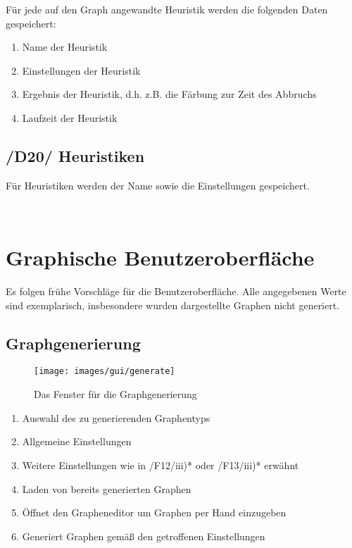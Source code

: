 \documentclass{article}
\begin{document}
	Für jede auf den Graph angewandte Heuristik werden die folgenden Daten gespeichert:
	\begin{enumerate}[--]
		\item{Name der Heuristik}
		\item{Einstellungen der Heuristik}
		\item{Ergebnis der Heuristik, d.h. z.B. die Färbung zur Zeit des Abbruchs}
		\item{Laufzeit der Heuristik}
	\end{enumerate}
	
	\subsection*{/D20/ Heuristiken} \label{d20} 
	Für Heuristiken werden der Name sowie die Einstellungen gespeichert.
	
	~\newpage
	\section{Graphische Benutzeroberfläche}
	Es folgen frühe Vorschläge für die Benutzeroberfläche. Alle angegebenen Werte sind exemplarisch, insbesondere wurden dargestellte Graphen nicht generiert.
	
	
	
	\subsection{Graphgenerierung}
	\begin{figure}[!h]
		\centering
		\texttt{[image: images/gui/generate]}
		\caption{Das Fenster für die Graphgenerierung}
	\end{figure}
	
	\FloatBarrier
	
	\begin{enumerate}[(1)]
		\item{Auswahl des zu generierenden Graphentyps}
		\item{Allgemeine Einstellungen}
		\item{Weitere Einstellungen wie in /F12/iii)* oder /F13/iii)* erwähnt}
		\item{Laden von bereits generierten Graphen}
		\item{Öffnet den Grapheneditor um Graphen per Hand einzugeben}
		\item{Generiert Graphen gemäß den getroffenen Einstellungen}
	\end{enumerate}
	
\end{document}
